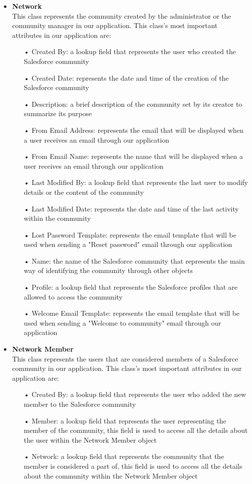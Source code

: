 \begin{itemize}
\begin{itemize}
\end{itemize}
\item \textbf{Network}\\
This class represents the community created by the administrator or the community manager in our application. This class's most important attributes in our application are:
\begin{itemize}
\item[•] Created By: a lookup field that represents the user who created the Salesforce community 
\item[•] Created Date: represents the date and time of the creation of the Salesforce community
\item[•] Description: a brief description of the community set by its creator to summarize its purpose
\item[•] From Email Address: represents the email that will be displayed when a user receives an email through our application
\item[•] From Email Name: represents the name that will be displayed when a user receives an email through our application
\item[•] Last Modified By: a lookup field that represents the last user to modify details or the content of the community
\item[•] Last Modified Date: represents the date and time of the last activity within the community
\item[•] Lost Password Template: represents the email template that will be used when sending a "Reset password" email through our application
\item[•] Name: the name of the Salesforce community that represents the main way of identifying the community through other objects
\item[•] Profile: a lookup field that represents the Salesforce profiles that are allowed to access the community
\item[•] Welcome Email Template: represents the email template that will be used when sending a "Welcome to community" email through our application
\end{itemize}
\item \textbf{Network Member}\\
This class represents the users that are considered members of a Salesforce community in our application. This class's most important attributes in our application are:
\begin{itemize}
\item[•] Created By: a lookup field that represents the user who added the new member to the Salesforce community 
\item[•] Member: a lookup field that represents the user representing the member of the community, this field is used to access all the details about the user within the Network Member object
\item[•] Network: a lookup field that represents the community that the member is considered a part of, this field is used to access all the details about the community within the Network Member object



\end{itemize}
\end{itemize}
